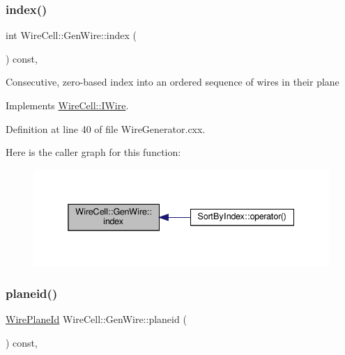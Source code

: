 \subsubsection{\texorpdfstring{index()}{index()}}
{\footnotesize\ttfamily int Wire\+Cell\+::\+Gen\+Wire\+::index (\begin{DoxyParamCaption}{ }\end{DoxyParamCaption}) const\hspace{0.3cm}{\ttfamily [inline]}, {\ttfamily [virtual]}}

Consecutive, zero-\/based index into an ordered sequence of wires in their plane 

Implements \hyperlink{class_wire_cell_1_1_i_wire_abe81fe1d38c3d0a73e812e765f2081cd}{Wire\+Cell\+::\+I\+Wire}.



Definition at line 40 of file Wire\+Generator.\+cxx.

Here is the caller graph for this function\+:
\nopagebreak
\begin{figure}[H]
\begin{center}
\leavevmode
\includegraphics[width=338pt]{class_wire_cell_1_1_gen_wire_a9d9189545db2c32b2c2e532cea2aa82e_icgraph}
\end{center}
\end{figure}
\mbox{\label{class_wire_cell_1_1_gen_wire_a3c2544d86575773427983718795ad6b5}} 
\subsubsection{\texorpdfstring{planeid()}{planeid()}}
{\footnotesize\ttfamily \hyperlink{class_wire_cell_1_1_wire_plane_id}{Wire\+Plane\+Id} Wire\+Cell\+::\+Gen\+Wire\+::planeid (\begin{DoxyParamCaption}{ }\end{DoxyParamCaption}) const\hspace{0.3cm}{\ttfamily [inline]}, {\ttfamily [virtual]}}



